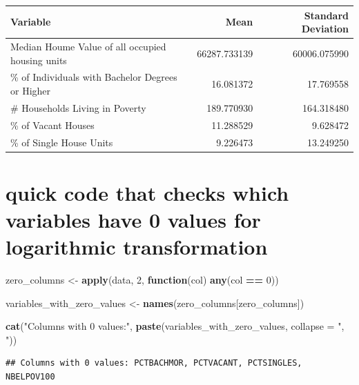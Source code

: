\documentclass[
]{article}
\newenvironment{Shaded}{\begin{snugshade}}{\end{snugshade}}
\newcommand{\AttributeTok}[1]{\textcolor[rgb]{0.13,0.29,0.53}{#1}}
\newcommand{\ControlFlowTok}[1]{\textcolor[rgb]{0.13,0.29,0.53}{\textbf{#1}}}
\newcommand{\DecValTok}[1]{\textcolor[rgb]{0.00,0.00,0.81}{#1}}
\newcommand{\FunctionTok}[1]{\textcolor[rgb]{0.13,0.29,0.53}{\textbf{#1}}}
\newcommand{\NormalTok}[1]{#1}
\newcommand{\OtherTok}[1]{\textcolor[rgb]{0.56,0.35,0.01}{#1}}
\newcommand{\SpecialCharTok}[1]{\textcolor[rgb]{0.81,0.36,0.00}{\textbf{#1}}}
\newcommand{\StringTok}[1]{\textcolor[rgb]{0.31,0.60,0.02}{#1}}
\begin{document}
\begin{table}
\centering
\begin{tabular}[t]{l|r|r}
\hline
Variable & Mean & Standard Deviation\\
\hline
Median Houme Value of all occupied housing units & 66287.733139 & 60006.075990\\
\hline
\% of Individuals with Bachelor Degrees or Higher & 16.081372 & 17.769558\\
\hline
\# Households Living in Poverty & 189.770930 & 164.318480\\
\hline
\% of Vacant Houses & 11.288529 & 9.628472\\
\hline
\% of Single House Units & 9.226473 & 13.249250\\
\hline
\end{tabular}
\end{table}

\hypertarget{quick-code-that-checks-which-variables-have-0-values-for-logarithmic-transformation}{%
\section{quick code that checks which variables have 0 values for
logarithmic
transformation}\label{quick-code-that-checks-which-variables-have-0-values-for-logarithmic-transformation}}

\begin{Shaded}
\begin{Highlighting}[]
\NormalTok{zero\_columns }\OtherTok{\textless{}{-}} \FunctionTok{apply}\NormalTok{(data, }\DecValTok{2}\NormalTok{, }\ControlFlowTok{function}\NormalTok{(col) }\FunctionTok{any}\NormalTok{(col }\SpecialCharTok{==} \DecValTok{0}\NormalTok{)) }

\NormalTok{variables\_with\_zero\_values }\OtherTok{\textless{}{-}} \FunctionTok{names}\NormalTok{(zero\_columns[zero\_columns])}

\FunctionTok{cat}\NormalTok{(}\StringTok{"Columns with 0 values:"}\NormalTok{, }\FunctionTok{paste}\NormalTok{(variables\_with\_zero\_values, }\AttributeTok{collapse =} \StringTok{", "}\NormalTok{))}
\end{Highlighting}
\end{Shaded}

\begin{verbatim}
## Columns with 0 values: PCTBACHMOR, PCTVACANT, PCTSINGLES, NBELPOV100
\end{verbatim}
\end{document}

